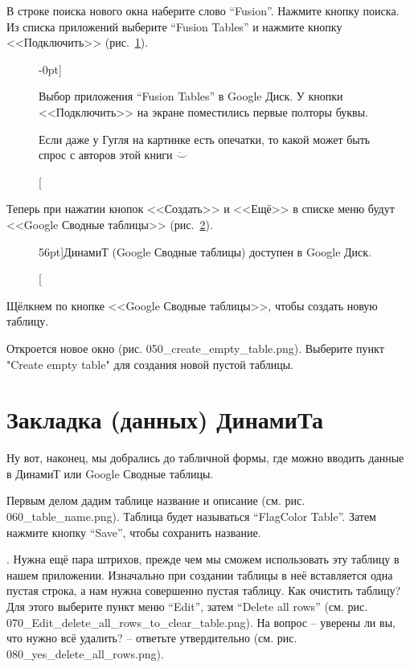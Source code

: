 В строке поиска нового окна наберите слово ``Fusion''. Нажмите кнопку поиска. 
Из списка приложений выберите ``Fusion Tables'' и нажмите кнопку <<Подключить>> 
(рис.~\ref{fig:add_fusion_to_drive}).

\begin{figure}
{%
\setlength{\fboxsep}{0pt}%
\setlength{\fboxrule}{1pt}%
%
}%
    \caption[Выбор приложения в Google Диск.][-0pt]{Выбор приложения 
            ``Fusion Tables'' в Google Диск. У кнопки <<Подключить>> 
            на экране поместились первые полторы буквы.

        { Если даже у Гугля на картинке есть опечатки, то какой может быть 
        спрос с авторов этой книги $\ddot\smile$
        }
    }
  \label{fig:add_fusion_to_drive}
\end{figure}

Теперь при нажатии кнопок <<Создать>> и <<Ещё>> в списке меню будут 
<<Google Сводные таблицы>> (рис.~\ref{fig:fusion_is_available_at_drive}).

\begin{figure}
{%
\setlength{\fboxsep}{0pt}%
\setlength{\fboxrule}{1pt}%
%
}%
    \caption[Google Сводные таблицы доступны в Google Диск.][56pt]{ДинамиТ 
            (Google Сводные таблицы) доступен в Google Диск.
    }
  \label{fig:fusion_is_available_at_drive}
\end{figure}

Щёлкнем по кнопке <<Google Сводные таблицы>>, чтобы создать новую таблицу.

Откроется новое окно (рис. 050\_create\_empty\_table.png). Выберите пункт 
"Create empty table" для создания новой пустой таблицы.


\section{Закладка (данных) ДинамиТа}

Ну вот, наконец, мы добрались до табличной формы, где можно вводить данные в ДинамиТ или Google Сводные таблицы.

Первым делом дадим таблице название и описание (см. рис. 060\_table\_name.png). 
Таблица будет называться ``FlagColor Table''. Затем нажмите кнопку ``Save'', чтобы сохранить название.

. Нужна ещё пара штрихов, прежде чем мы сможем использовать эту таблицу в нашем приложении. 
Изначально при создании таблицы в неё вставляется одна пустая строка, а нам нужна совершенно пустая таблицу. Как очистить таблицу? 
Для этого выберите пункт меню ``Edit'', затем ``Delete all rows'' (см. рис. 070\_Edit\_delete\_all\_rows\_to\_clear\_table.png). 
На вопрос -- уверены ли вы, что нужно всё удалить? -- ответьте утвердительно (см. рис. 080\_yes\_delete\_all\_rows.png).


